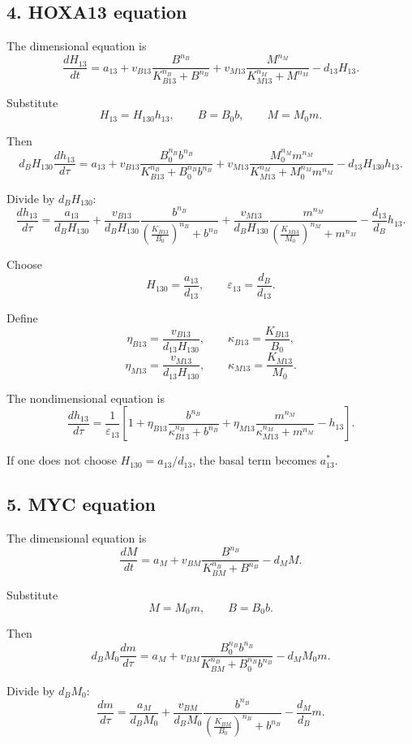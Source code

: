 \documentclass[11pt]{article}
\begin{document}
\subsection{4. HOXA13 equation}

The dimensional equation is
\[
\frac{dH_{13}}{dt}
=
a_{13}
+
v_{B13}
\frac{B^{n_B}}
{K_{B13}^{n_B}+B^{n_B}}
+
v_{M13}
\frac{M^{n_M}}
{K_{M13}^{n_M}+M^{n_M}}
-
d_{13}H_{13}.
\]

Substitute
\[
H_{13}=H_{130}h_{13},\qquad B=B_0b,\qquad M=M_0m.
\]

Then
\[
d_BH_{130}\frac{dh_{13}}{d\tau}
=
a_{13}
+
v_{B13}
\frac{B_0^{n_B}b^{n_B}}
{K_{B13}^{n_B}+B_0^{n_B}b^{n_B}}
+
v_{M13}
\frac{M_0^{n_M}m^{n_M}}
{K_{M13}^{n_M}+M_0^{n_M}m^{n_M}}
-
d_{13}H_{130}h_{13}.
\]

Divide by \(d_BH_{130}\):
\[
\frac{dh_{13}}{d\tau}
=
\frac{a_{13}}{d_BH_{130}}
+
\frac{v_{B13}}{d_BH_{130}}
\frac{b^{n_B}}
{\left(\frac{K_{B13}}{B_0}\right)^{n_B}+b^{n_B}}
+
\frac{v_{M13}}{d_BH_{130}}
\frac{m^{n_M}}
{\left(\frac{K_{M13}}{M_0}\right)^{n_M}+m^{n_M}}
-
\frac{d_{13}}{d_B}h_{13}.
\]

Choose
\[
H_{130}=\frac{a_{13}}{d_{13}},
\qquad
\varepsilon_{13}=\frac{d_B}{d_{13}}.
\]

Define
\[
\eta_{B13}=\frac{v_{B13}}{d_{13}H_{130}},
\qquad
\kappa_{B13}=\frac{K_{B13}}{B_0},
\]
\[
\eta_{M13}=\frac{v_{M13}}{d_{13}H_{130}},
\qquad
\kappa_{M13}=\frac{K_{M13}}{M_0}.
\]

The nondimensional equation is
\[
\boxed{
\frac{dh_{13}}{d\tau}
=
\frac{1}{\varepsilon_{13}}
\left[
1
+
\eta_{B13}
\frac{b^{n_B}}
{\kappa_{B13}^{n_B}+b^{n_B}}
+
\eta_{M13}
\frac{m^{n_M}}
{\kappa_{M13}^{n_M}+m^{n_M}}
-
h_{13}
\right].
}
\]

If one does not choose \(H_{130}=a_{13}/d_{13}\), the basal term becomes \(a_{13}^*\).

\subsection{5. MYC equation}

The dimensional equation is
\[
\frac{dM}{dt}
=
a_M
+
v_{BM}
\frac{B^{n_B}}
{K_{BM}^{n_B}+B^{n_B}}
-
d_MM.
\]

Substitute
\[
M=M_0m,\qquad B=B_0b.
\]

Then
\[
d_BM_0\frac{dm}{d\tau}
=
a_M
+
v_{BM}
\frac{B_0^{n_B}b^{n_B}}
{K_{BM}^{n_B}+B_0^{n_B}b^{n_B}}
-
d_MM_0m.
\]

Divide by \(d_BM_0\):
\[
\frac{dm}{d\tau}
=
\frac{a_M}{d_BM_0}
+
\frac{v_{BM}}{d_BM_0}
\frac{b^{n_B}}
{\left(\frac{K_{BM}}{B_0}\right)^{n_B}+b^{n_B}}
-
\frac{d_M}{d_B}m.
\]
\end{document}
